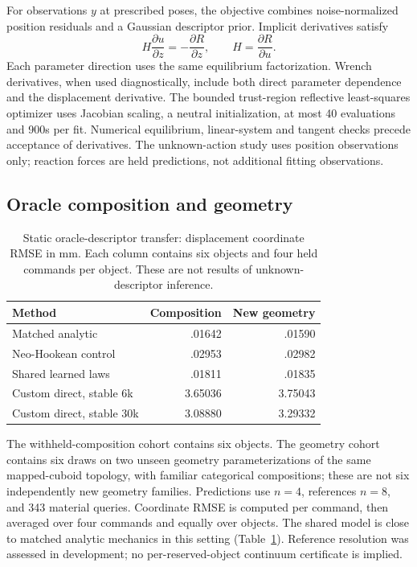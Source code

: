 \documentclass[10pt,twocolumn,letterpaper]{article}
\begin{document}
For observations $y$ at prescribed poses, the objective combines noise-normalized position residuals and a Gaussian descriptor prior. Implicit derivatives satisfy
\begin{equation}
 H\frac{\partial u}{\partial z}=-\frac{\partial R}{\partial z},\qquad H=\frac{\partial R}{\partial u}.
\end{equation}
Each parameter direction uses the same equilibrium factorization. Wrench derivatives, when used diagnostically, include both direct parameter dependence and the displacement derivative. The bounded trust-region reflective least-squares optimizer uses Jacobian scaling, a neutral initialization, at most 40 evaluations and 900s per fit. Numerical equilibrium, linear-system and tangent checks precede acceptance of derivatives. The unknown-action study uses position observations only; reaction forces are held predictions, not additional fitting observations.

\subsection{Oracle composition and geometry}
\begin{table}[t]
\centering\small
\begin{tabular}{lrr}
\toprule
Method & Composition & New geometry\\
\midrule
Matched analytic & .01642 & .01590\\
Neo-Hookean control & .02953 & .02982\\
Shared learned laws & .01811 & .01835\\
Custom direct, stable 6k & 3.65036 & 3.75043\\
Custom direct, stable 30k & 3.08880 & 3.29332\\
\bottomrule
\end{tabular}
\caption{Static oracle-descriptor transfer: displacement coordinate RMSE in mm. Each column contains six objects and four held commands per object. These are not results of unknown-descriptor inference.}
\label{tab:oracle}
\end{table}
The withheld-composition cohort contains six objects. The geometry cohort contains six draws on two unseen geometry parameterizations of the same mapped-cuboid topology, with familiar categorical compositions; these are not six independently new geometry families. Predictions use $n=4$, references $n=8$, and 343 material queries. Coordinate RMSE is computed per command, then averaged over four commands and equally over objects. The shared model is close to matched analytic mechanics in this setting (Table~\ref{tab:oracle}). Reference resolution was assessed in development; no per-reserved-object continuum certificate is implied.
\end{document}
